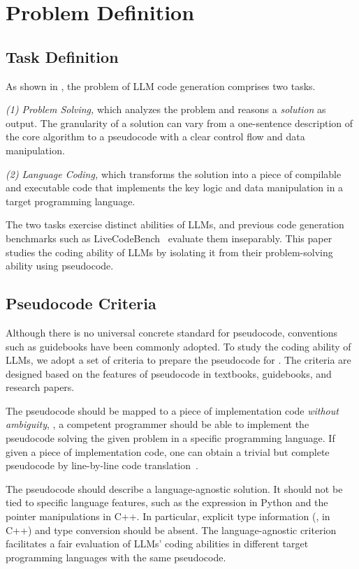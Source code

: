\section{Problem Definition}
\subsection{Task Definition}

As shown in , the problem of LLM code generation comprises two tasks.

\emph{(1) Problem Solving,} which analyzes the problem and reasons a \emph{solution} as output.
The granularity of a solution can vary from a one-sentence description of the core algorithm to a pseudocode with a clear control flow and data manipulation.%
 
\emph{(2) Language Coding,} which transforms the solution into a piece of compilable and executable code that implements the key logic and data manipulation in a target programming language.

The two tasks exercise distinct abilities of LLMs, and previous code generation benchmarks such as LiveCodeBench~\cite{livecb} evaluate them inseparably.
This paper studies the coding ability of LLMs by isolating it from their problem-solving ability using pseudocode. %

\subsection{Pseudocode Criteria}\label{subsec:criteria}
Although there is no universal concrete standard for pseudocode, conventions such as guidebooks have been commonly adopted. %
To study the coding ability of LLMs, we adopt a set of criteria to prepare the pseudocode for \benchname. The criteria are designed based on the features of pseudocode in textbooks, guidebooks, and research papers. %


The pseudocode should be mapped to a piece of implementation code \emph{without ambiguity}, \eg, a competent programmer should be able to implement the pseudocode solving the given problem in a specific programming language.
If given a piece of implementation code, one can obtain a trivial but complete pseudocode by line-by-line code translation~\cite{spoc}.



The pseudocode should describe a language-agnostic solution. It should not be tied to specific language features, such as the  expression in Python and the pointer manipulations in C++.
In particular, explicit type information (\eg,  in C++) and type conversion should be absent.
The language-agnostic criterion facilitates a fair evaluation of LLMs' coding abilities in different target programming languages with the same pseudocode.

